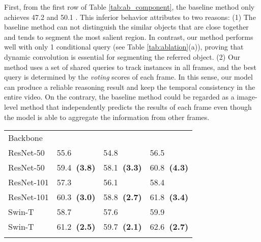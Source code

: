 \documentclass[10pt,twocolumn,letterpaper]{article}
\newcommand{\posacc}[1]{{\bf \fontsize{8.0}{42}\selectfont \color{mygreen}~(#1)}}
\begin{document}
{First, from the first row of Table \ref{tab:ab_component}, the baseline method only achieves 47.2  and 50.1 . This inferior behavior attributes to two reasons: (1) The baseline method can not distinguish the similar objects that are close together and tends to segment the most salient region. In contrast, our method performs well with only 1 conditional query (see Table \ref{tab:ablation}(a)), proving that dynamic convolution is essential for segmenting the referred object. (2) Our method uses a set of shared queries to track instances in all frames, and the best query is determined by the \textit{voting} scores of each frame. In this sense, our model can produce a reliable reasoning result and keep the temporal consistency in the entire video. On the contrary, the baseline method could be regarded as a image-level method that independently predicts the results of each frame even though the model is able to aggregate the information from other frames.


\begin{table}[t]
    \begin{center}
        \begin{tabular}{l | l l l }

\toprule

Backbone & \multicolumn{1}{c}{} & \multicolumn{1}{c}{} & \multicolumn{1}{c}{} \\

\arrayrulecolor{white}\hline
\arrayrulecolor{black}\hline
\arrayrulecolor{white}\hline

ResNet-50 & 55.6 & 54.8 & 56.5 \\
ResNet-50 & 59.4\posacc{3.8} & 58.1\posacc{3.3} & 60.8\posacc{4.3} \\

\arrayrulecolor{white}\hline
\arrayrulecolor{black}\hline
\arrayrulecolor{white}\hline

ResNet-101 & 57.3 & 56.1 & 58.4 \\
ResNet-101 & 60.3\posacc{3.0} & 58.8\posacc{2.7} & 61.8\posacc{3.4} \\

\arrayrulecolor{white}\hline
\arrayrulecolor{black}\hline
\arrayrulecolor{white}\hline

Swin-T & 58.7 & 57.6 & 59.9 \\
Swin-T & 61.2\posacc{2.5} & 59.7\posacc{2.1} & 62.6\posacc{2.7} \\

\arrayrulecolor{white}\hline
\arrayrulecolor{black}\hline
\arrayrulecolor{white}\hline


\end{tabular}
\end{center}
\end{table}}
\end{document}
